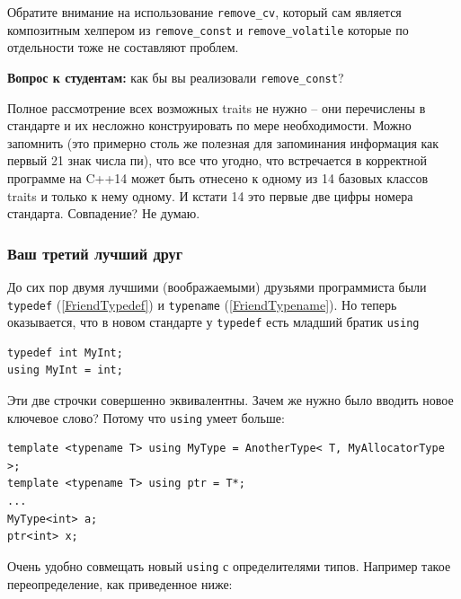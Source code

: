 \documentclass[a4paper,12pt,oneside]{article}
\newif\ifanswers
\begin{document}
Обратите внимание на использование \lstinline!remove_cv!, который сам является композитным хелпером из \lstinline!remove_const! и \lstinline!remove_volatile! которые по отдельности тоже не составляют проблем.

\textbf{Вопрос к студентам:} как бы вы реализовали \lstinline!remove_const!? 

\ifanswers
Правильный ответ:

\begin{lstlisting}
template <typename T> 
struct remove_const { typedef T type; };
template <typename T> 
struct remove_const<const T> { typedef T type; };
\end{lstlisting}
\fi

Полное рассмотрение всех возможных traits не нужно -- они перечислены в стандарте и их несложно конструировать по мере необходимости. Можно запомнить (это примерно столь же полезная для запоминания информация как первый 21 знак числа пи), что все что угодно, что встречается в корректной программе на C++14 может быть отнесено к одному из 14 базовых классов traits и только к нему одному. И кстати 14 это первые две цифры номера стандарта. Совпадение? Не думаю.

\subsubsection{Ваш третий лучший друг}\label{FriendUsing}

До сих пор двумя лучшими (воображаемыми) друзьями программиста были \lstinline!typedef! (\ref{FriendTypedef}) и \lstinline!typename! (\ref{FriendTypename}). Но теперь оказывается, что в новом стандарте у \lstinline!typedef! есть младший братик \lstinline!using!

\begin{lstlisting}
typedef int MyInt;
using MyInt = int;
\end{lstlisting}

Эти две строчки совершенно эквивалентны. Зачем же нужно было вводить новое ключевое слово? Потому что \lstinline!using! умеет больше:

\begin{lstlisting}
template <typename T> using MyType = AnotherType< T, MyAllocatorType >; 
template <typename T> using ptr = T*;
...
MyType<int> a;
ptr<int> x;
\end{lstlisting}

Очень удобно совмещать новый \lstinline!using! с определителями типов. Например такое переопределение, как приведенное ниже:
\end{document}
